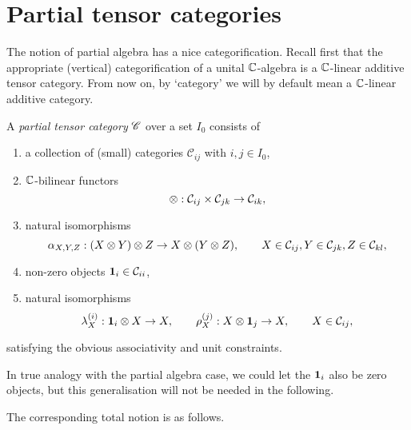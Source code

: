 \section{Partial tensor categories}


The notion of partial algebra has a nice categorification. %
Recall first that the appropriate (vertical) categorification of a unital $\mathbb{C}$-algebra is a $\mathbb{C}$-linear additive tensor category. From now on, by `category' we will by default mean a $\mathbb{C}$-linear additive category. 

\begin{Def} A \emph{partial tensor category} $\mathscr{C}$ over a set $I_0$ consists of 
\begin{enumerate}[label=(\alph*)]
\item a collection of (small) categories $\mathcal{C}_{ij}$ with $i,j\in I_0$, 
\item $\mathbb{C}$-bilinear functors \[\otimes: \mathcal{C}_{ij}\times \mathcal{C}_{jk}\rightarrow \mathcal{C}_{ik},\] 
\item natural isomorphisms \[ \alpha_{X,Y,Z}: (X\otimes Y)\otimes Z \rightarrow X\otimes (Y\otimes Z),\qquad X \in \mathcal{C}_{ij},Y\in \mathcal{C}_{jk},Z\in \mathcal{C}_{kl},\] 
\item non-zero objects $\mathbf{1}_{i} \in \mathcal{C}_{ii}$,
\item natural isomorphisms \[\lambda_X^{(i)}:\mathbf{1}_i\otimes X \rightarrow X,\qquad \rho_X^{(j)}:X\otimes \mathbf{1}_j\rightarrow X, \qquad X\in \mathcal{C}_{ij},\]
\end{enumerate}
satisfying the obvious associativity and unit constraints. 
\end{Def}

\begin{Rem} In true analogy with the partial algebra case, we could let the $\mathbf{1}_i$ also be zero objects, but this generalisation will not be needed in the following. 
\end{Rem}

The corresponding total notion is as follows. 

